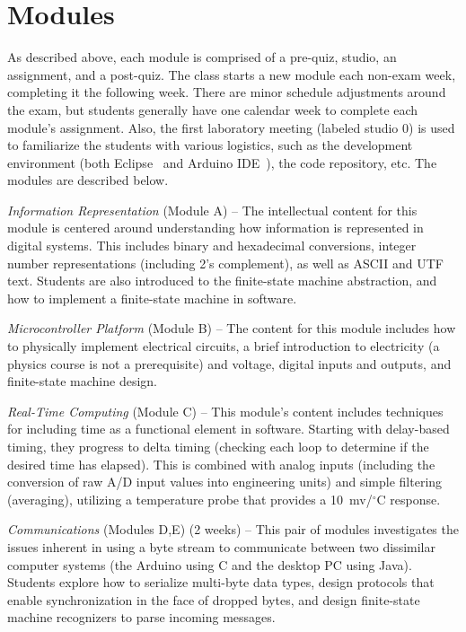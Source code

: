 \section{Modules}
\label{sec:weeks}

As described above, each module is comprised of a pre-quiz, studio,
an assignment, and a post-quiz.  The class starts a new module each
non-exam week, completing it the following week. There are minor schedule
adjustments around the exam, but students generally have one calendar week
to complete each module's assignment.
Also, the first laboratory meeting (labeled studio 0) is used to familiarize
the students with various logistics, such as the development environment
(both Eclipse~\cite{eclipse} and Arduino IDE~\cite{arduino}),
the code repository, etc.
The modules are described below.

\emph{Information Representation} (Module A) --
The intellectual content for this module is centered around understanding
how information is represented in digital systems. This includes binary and
hexadecimal conversions, integer
number representations (including 2's complement), as well as
ASCII and UTF text.
Students are also introduced to the finite-state machine abstraction,
and how to implement a finite-state machine in software.

\emph{Microcontroller Platform} (Module B) --
The content for this module includes how to physically implement electrical
circuits, a brief introduction to electricity (a physics course is not a
prerequisite) and voltage, digital inputs and outputs, and finite-state
machine design.

\emph{Real-Time Computing} (Module C) --
This module's content includes techniques for including time as a functional
element in software. Starting with delay-based timing, they progress to delta
timing (checking each loop to determine if the desired time has elapsed).
This is combined with analog inputs (including the conversion of raw A/D
input values into engineering units) and simple filtering (averaging),
utilizing a temperature probe that provides a 10~mv/$^\circ$C response.

\emph{Communications} (Modules D,E) (2 weeks) --
This pair of modules investigates the issues inherent in using a byte stream
to communicate between two dissimilar computer systems (the Arduino using C
and the desktop PC using Java).  Students explore how
to serialize multi-byte data types, design protocols that enable synchronization
in the face of dropped bytes,
and design finite-state machine recognizers to parse incoming messages.

